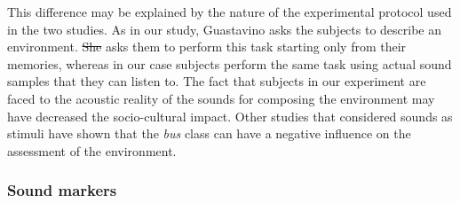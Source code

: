 \documentclass[12pt]{elsarticle}
\providecommand{\DIFadd}[1]{{\protect\color{blue}\uwave{#1}}} %
\providecommand{\DIFdel}[1]{{\protect\color{red}\sout{#1}}}                      %
\providecommand{\DIFaddbegin}{} %
\providecommand{\DIFaddend}{} %
\providecommand{\DIFdelbegin}{} %
\providecommand{\DIFdelend}{} %
\begin{document}

This difference may be explained by the nature of the experimental protocol used in the two studies. As in our study, Guastavino asks the subjects to describe an environment. \DIFdelbegin \DIFdel{She }\DIFdelend \DIFaddbegin \DIFadd{But she }\DIFaddend asks them to perform this task starting only from their memories, whereas in our case subjects perform the same task using actual sound samples that they can listen to. The fact that subjects in our experiment are faced to the acoustic reality of the sounds for composing the environment may have decreased the socio-cultural impact. Other studies that considered sounds as stimuli have shown that the \emph{bus} class can have a negative influence on the assessment of the environment\DIFaddbegin \DIFadd{, see~}\DIFaddend \cite{lavandier2006contribution}.

\DIFaddbegin 

\DIFaddend \subsubsection*{Sound markers}
\end{document}
